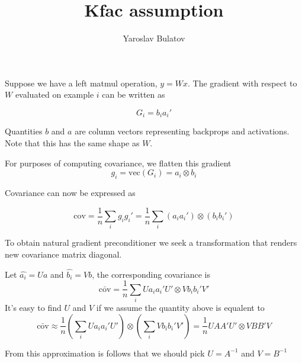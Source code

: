 \documentclass{article}
\begin{document}
\title{Kfac assumption}
\author{Yaroslav Bulatov}

\maketitle

Suppose we have a left matmul operation, $y=Wx$.
The gradient with respect to $W$ evaluated on example $i$ can be written as

$$G_i = b_i a_i'$$

Quantities $b$ and $a$ are column vectors representing backprops and activations. Note that this has the same shape as $W$.


For purposes of computing covariance, we flatten this gradient
$$g_i = \text{vec}(G_i) = a_i \otimes b_i$$

Covariance can now be expressed as

$$\text{cov} = \frac{1}{n} \sum_i g_i g_i'=\frac{1}{n}\sum_i(a_ia_i')\otimes (b_ib_i')$$

To obtain natural gradient preconditioner we seek a transformation that renders new covariance matrix diagonal.

Let $\hat{a_i}=Ua$ and $\hat{b_i}=Vb$, the corresponding covariance is
$$\bar{\text{cov}} = \frac{1}{n} \sum_i U a_ia_i' U' \otimes Vb_ib_i'V'$$
It's easy to find $U$ and $V$ if we assume the quantity above is equalent to
$$\bar{\text{cov}}\approx \frac{1}{n} (\sum_i U a_ia_i' U')  \otimes (\sum_i Vb_ib_i'V') = \frac{1}{n} UAA'U' \otimes VBB'V$$

From this approximation is follows that we should pick $U=A^{-1}$ and $V=B^{-1}$
\end{document}
